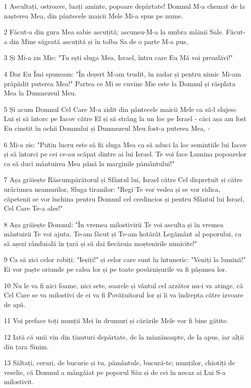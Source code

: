 \par 1 Ascultați, ostroave, luați aminte, popoare depărtate! Domnul M-a chemat de la nașterea Mea, din pântecele maicii Mele Mi-a spus pe nume.
\par 2 Făcut-a din gura Mea sabie ascuțită; ascunsu-M-a la umbra mâinii Sale. Făcut-a din Mine săgeată ascuțită și în tolba Sa de o parte M-a pus,
\par 3 Și Mi-a zis Mie: "Tu ești sluga Mea, Israel, întru care Eu Mă voi preaslăvi!"
\par 4 Dar Eu Îmi spuneam: "În deșert M-am trudit, în zadar și pentru nimic Mi-am prăpădit puterea Mea!" Partea ce Mi se cuvine Mie este la Domnul și răsplata Mea la Dumnezeul Meu.
\par 5 Și acum Domnul Cel Care M-a zidit din pântecele maicii Mele ca să-l slujesc Lui și să întorc pe Iacov către El și să strâng la un loc pe Israel - căci așa am fost Eu cinstit în ochii Domnului și Dumnezeul Meu fost-a puterea Mea, -
\par 6 Mi-a zis: "Puțin lucru este să fii sluga Mea ca să aduci la loc semințiile lui Iacov și să întorci pe cei ce-au scăpat dintre ai lui Israel. Te voi face Lumina popoarelor ca să duci mântuirea Mea până la marginile pământului!"
\par 7 Așa grăiește Răscumpărătorul și Sfântul lui, Israel către Cel disprețuit și către urâciunea neamurilor, Sluga tiranilor: "Regi Te vor vedea și se vor ridica, căpetenii se vor închina pentru Domnul cel credincios și pentru Sfântul lui Israel, Cel Care Te-a ales!"
\par 8 Așa grăiește Domnul: "În vremea milostivirii Te voi asculta și în vremea mântuirii Te voi ajuta. Te-am făcut și Te-am hotărât Legământ al poporului, ca să așezi rânduială în țară și să dai fiecăruia moștenirile nimicite!"
\par 9 Ca să zici celor robiți: "Ieșiți!" și celor care sunt în întuneric: "Veniți la lumină!" Ei vor paște oriunde pe calea lor și pe toate povârnișurile va fi pășunea lor.
\par 10 Nu le va fi nici foame, nici sete, soarele și vântul cel arzător nu-i va atinge, că Cel Care se va milostivi de ei va fi Povățuitorul lor și îi va îndrepta către izvoare de apă.
\par 11 Voi preface toți munții Mei în drumuri și cărările Mele vor fi bine gătite.
\par 12 Iată că unii vin din ținuturi depărtate, de la miazănoapte, de la apus, iar alții din țara Sinim.
\par 13 Săltați, ceruri, de bucurie și tu, pământule, bucură-te; munților, chiotiți de veselie, că Domnul a mângâiat pe poporul Său și de cei în necaz ai Lui S-a milostivit.
